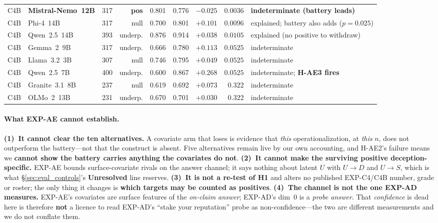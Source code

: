 \begin{table}[htbp]
\begin{scriptsize}
\begin{tabular}{@{}llrrrrrrl@{}}
C4B & \textbf{Mistral-Nemo~12B} & 317 & \textbf{pos} & 0.801 & 0.776 & $-0.025$ & $0.0036$ & \textbf{indeterminate (battery leads)} \\
C4B & Phi-4~14B               & 317 & null & 0.700 & 0.801 & $+0.101$ & $0.0096$ & explained; battery also adds ($p\!=\!0.025$) \\
C4B & Qwen~2.5~14B            & 393 & underp. & 0.876 & 0.914 & $+0.038$ & $0.0105$ & explained (no positive to withdraw) \\
C4B & Gemma~2~9B              & 317 & underp. & 0.666 & 0.780 & $+0.113$ & $0.0525$ & indeterminate \\
C4B & Llama~3.2~3B            & 307 & null & 0.746 & 0.795 & $+0.049$ & $0.0525$ & indeterminate \\
C4B & Qwen~2.5~7B             & 400 & underp. & 0.600 & 0.867 & $+0.268$ & $0.0525$ & indeterminate; \textbf{H-AE3 fires} \\
C4B & Granite~3.1~8B          & 237 & null & 0.619 & 0.692 & $+0.073$ & $0.322$ & indeterminate \\
C4B & OLMo~2~13B              & 231 & underp. & 0.670 & 0.701 & $+0.030$ & $0.322$ & indeterminate \\
\bottomrule
\end{tabular}
\end{scriptsize}
\end{table}

\paragraph{What EXP-AE cannot establish.} \textbf{(1)~It cannot clear the ten alternatives.} A covariate arm that loses is evidence that \emph{this} operationalization, at \emph{this} $n$, does not outperform the battery---not that the construct is absent. Five alternatives remain live by our own accounting, and H-AE2's failure means we \textbf{cannot show the battery carries anything the covariates do not}. \textbf{(2)~It cannot make the surviving positive deception-specific.} EXP-AE bounds surface-covariate rivals on the answer channel; it says nothing about latent $U$ with $U\!\to\!D$ and $U\!\to\!S$, which is what §\ref{sec:eval_controls}'s \textbf{Unresolved} line reserves. \textbf{(3)~It is not a re-test of H1} and alters no published EXP-C4/C4B number, grade or roster; the only thing it changes is \textbf{which targets may be counted as positives}. \textbf{(4)~The channel is not the one EXP-AD measures.} EXP-AE's covariates are surface features of the \emph{on-claim answer}; EXP-AD's dim~0 is a \emph{probe answer}. That \emph{confidence} is dead here is therefore \textbf{not} a licence to read EXP-AD's ``stake your reputation'' probe as non-confidence---the two are different measurements and we do not conflate them.

